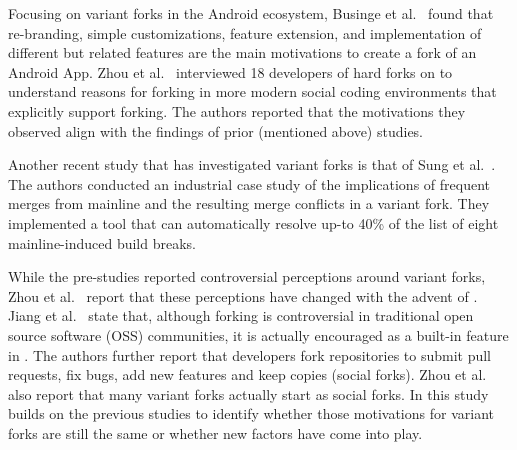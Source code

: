 
Focusing on variant forks in the Android ecosystem, Businge et al.~\cite{businge2018appfamilies} found that re-branding, simple customizations, feature extension, and implementation of different but related features are the main motivations to create a fork of an Android App.
Zhou et al.~\cite{Zhou:2020} interviewed 18 developers of hard forks on \gh to understand reasons for forking in more modern social coding environments that explicitly support forking. The authors reported that the motivations they observed align with the findings of prior (mentioned above) studies.

Another recent study that has investigated variant forks is that of Sung et al.~\cite{sung:ICSE:2020}. The authors conducted an industrial case study of the implications of frequent merges from mainline and the resulting merge conflicts in a variant fork. They implemented a tool that can automatically resolve up-to 40\% of the list of eight mainline-induced build breaks.

While the pre-\gh studies reported controversial perceptions around variant forks, Zhou et al.~\cite{Zhou:2020} report that these perceptions have changed with the advent of \gh. Jiang et al.~\cite{Lo:2017} state that, although forking is controversial in traditional open source software (OSS) communities, it is actually encouraged as a built-in feature in \gh. The authors further report that developers fork repositories to submit pull requests, fix bugs, add new features and keep copies (social forks).
Zhou et al.~\cite{Zhou:2020} also report that many variant forks actually start as social forks.
In this study builds on the previous studies to identify whether those motivations for variant forks are still the same or whether new factors have come into play.  

